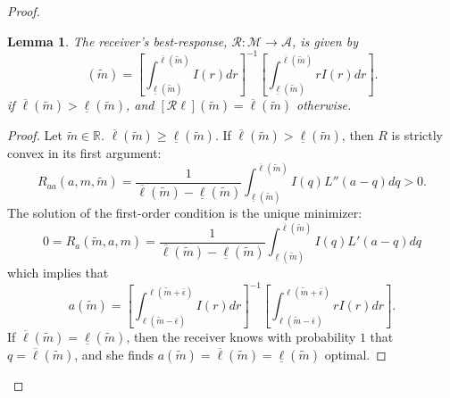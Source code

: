 \documentclass[12pt]{article}
\newtheorem{lemma}{Lemma}
\begin{document}
\begin{proof}
\begin{lemma}
The receiver's best-response, $\mathcal{R}:\mathcal{M}\rightarrow\mathcal{A}$, is given by
\begin{equation}
[\mathcal{R}\ell](\tilde{m})=\left[\int_{\underline{\ell}(\tilde{m})}^{\overline{\ell}(\tilde{m})}{I(r)dr}\right]^{-1}\left[\int_{\underline{\ell}(\tilde{m})}^{\overline{\ell}(\tilde{m})}{rI(r)dr}\right].
\end{equation}
if $\overline{\ell}(\tilde{m})>\underline{\ell}(\tilde{m})$, and $[\mathcal{R}\ell](\tilde{m})=\overline{\ell}(\tilde{m})$ otherwise. 
\end{lemma}
\begin{proof}
Let $\tilde{m}\in\mathbb{R}$. $\overline{\ell}(\tilde{m})\geq\underline{\ell}(\tilde{m})$. If $\overline{\ell}(\tilde{m})>\underline{\ell}(\tilde{m})$, then $R$ is strictly convex in its first argument:
\begin{equation}
R_{aa}(a,m,\tilde{m})=\frac{1}{\overline{\ell}(\tilde{m})-\underline{\ell}(\tilde{m})}\int_{\underline{\ell}(\tilde{m})}^{\overline{\ell}(\tilde{m})}{I(q)L''(a-q)dq}>0.
\end{equation}
The solution of the first-order condition is the unique minimizer:
\begin{equation}
0=R_{a}(\tilde{m},a,m)=\frac{1}{\overline{\ell}(\tilde{m})-\underline{\ell}(\tilde{m})}\int_{\underline{\ell}(\tilde{m})}^{\overline{\ell}(\tilde{m})}{I(q)L'(a-q)dq}
\end{equation}
which implies that
\begin{equation}
a(\tilde{m})=\left[\int_{\ell(\tilde{m}-\bar{\epsilon})}^{\ell(\tilde{m}+\bar{\epsilon})}{I(r)dr}\right]^{-1}\left[\int_{\ell(\tilde{m}-\bar{\epsilon})}^{\ell(\tilde{m}+\bar{\epsilon})}{rI(r)dr}\right].
\end{equation}
If $\overline{\ell}(\tilde{m})=\underline{\ell}(\tilde{m})$, then the receiver knows with probability $1$ that $q=\overline{\ell}(\tilde{m})$, and she finds $a(\tilde{m})=\overline{\ell}(\tilde{m})=\underline{\ell}(\tilde{m})$ optimal.
\end{proof}
\end{proof}
\end{document}
